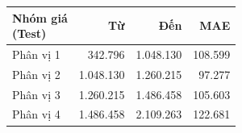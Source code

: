 \begin{tabular}{lrrr}
\toprule
\makecell[l]{Nhóm giá\\(Test)} & Từ & Đến & MAE \\
\midrule
Phân vị 1 & 342{.}796 & 1{.}048{.}130 & 108{.}599 \\
Phân vị 2 & 1{.}048{.}130 & 1{.}260{.}215 & 97{.}277 \\
Phân vị 3 & 1{.}260{.}215 & 1{.}486{.}458 & 105{.}603 \\
Phân vị 4 & 1{.}486{.}458 & 2{.}109{.}263 & 122{.}681 \\
\bottomrule
\end{tabular}
